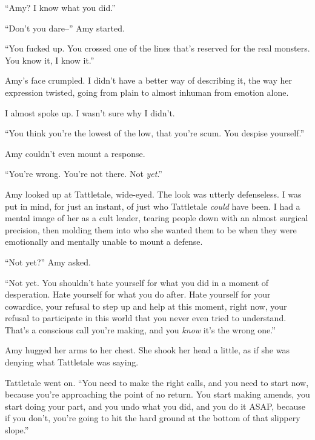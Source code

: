 ``Amy?  I know what you did.''



``Don't you dare--'' Amy started.



``You fucked up.  You crossed one of the lines that's reserved for the real monsters.  You know it, I know it.''



Amy's face crumpled.  I didn't have a better way of describing it, the way her expression twisted, going from plain to almost inhuman from emotion alone.



I almost spoke up.  I wasn't sure why I didn't.



``You think you're the lowest of the low, that you're scum.  You despise yourself.''



Amy couldn't even mount a response.



``You're wrong.  You're not there.  Not \emph{yet}.''



Amy looked up at Tattletale, wide-eyed.  The look was utterly defenseless.  I was put in mind, for just an instant, of just who Tattletale \emph{could} have been.  I had a mental image of her as a cult leader, tearing people down with an almost surgical precision, then molding them into who she wanted them to be when they were emotionally and mentally unable to mount a defense.



``Not yet?'' Amy asked.



``Not yet.  You shouldn't hate yourself for what you did in a moment of desperation.  Hate yourself for what you do after.  Hate yourself for your cowardice, your refusal to step up and help at this moment, right now, your refusal to participate in this world that you never even tried to understand.  That's a conscious call you're making, and you \emph{know} it's the wrong one.''



Amy hugged her arms to her chest.  She shook her head a little, as if she was denying what Tattletale was saying.



Tattletale went on.  ``You need to make the right calls, and you need to start now, because you're approaching the point of no return.  You start making amends, you start doing your part, and you undo what you did, and you do it ASAP, because if you don't, you're going to hit the hard ground at the bottom of that slippery slope.''



